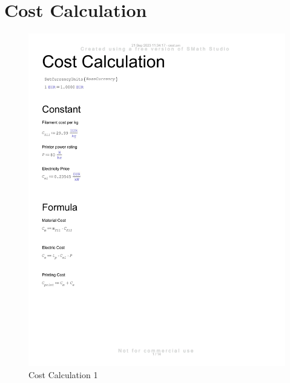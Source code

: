 \section{Cost Calculation}
\label{appendix:cost-calculation}

\begin{figure}[H]
    \centering
    \includegraphics[width=\linewidth]{texs/appendix/data/cost1-01.jpg}
    \caption{Cost Calculation 1}
    \label{fig:cost-calculation-1}
\end{figure}

